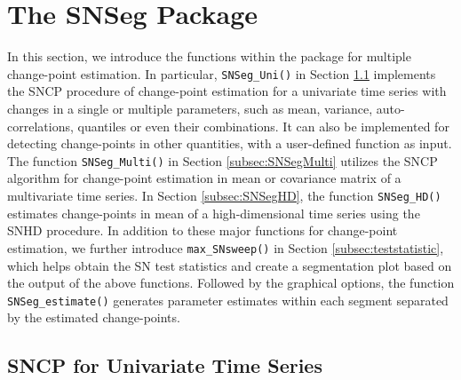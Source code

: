 \section{The SNSeg Package}\label{sec:SNSeg}
In this section, we introduce the functions within the  package for multiple change-point estimation. In particular,  \texttt{SNSeg\_Uni()} in  Section \ref{subsec:SNSegUni} implements the SNCP procedure of change-point estimation for a univariate time series with changes in a single or multiple parameters, such as mean, variance, auto-correlations, quantiles or even their combinations. {It can also be implemented for detecting change-points in other quantities, with a user-defined function as input.} The function \texttt{SNSeg\_Multi()} in  Section  \ref{subsec:SNSegMulti}   utilizes the SNCP algorithm for change-point estimation in mean or covariance matrix of a multivariate time series. In  Section \ref{subsec:SNSegHD},  the function \texttt{SNSeg\_HD()} estimates change-points in mean of a high-dimensional time series using the SNHD procedure. In addition to these major functions for change-point estimation, we further introduce \texttt{max\_SNsweep()} in Section  \ref{subsec:teststatistic}, which helps obtain the SN test statistics and create a segmentation plot based on the output of the above functions. {Followed by the graphical options, the function \texttt{SNSeg\_estimate()} generates parameter estimates within each segment separated by the estimated change-points.}

\subsection{SNCP for Univariate Time Series}\label{subsec:SNSegUni}

